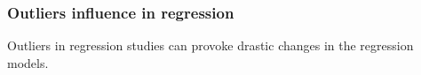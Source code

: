\begin{frame}
\frametitle{Outliers influence in regression}
Outliers in regression studies can provoke drastic changes in the regression models. 
\begin{center}
\resizebox{0.49\textwidth}{!}{}
\resizebox{0.49\textwidth}{!}{}
\end{center}
\end{frame}

%   
% 
% 
% 
% 
% 
